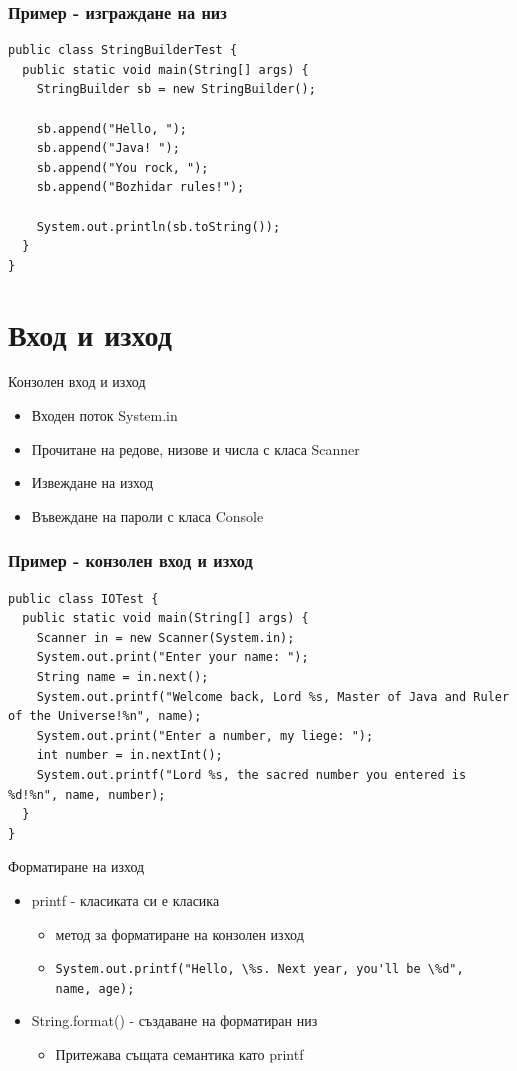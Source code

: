 \documentclass{beamer}
\begin{document}
\begin{frame}[fragile]
  \frametitle{Пример - изграждане на низ}
  \transdissolve
\begin{lstlisting}
public class StringBuilderTest {
  public static void main(String[] args) {
    StringBuilder sb = new StringBuilder();

    sb.append("Hello, ");
    sb.append("Java! ");
    sb.append("You rock, ");
    sb.append("Bozhidar rules!");

    System.out.println(sb.toString());
  }
}  
\end{lstlisting}
\end{frame}

\section{Вход и изход}
\begin{frame}{Конзолен вход и изход}
  \transdissolve
  \begin{itemize}
  \item Входен поток System.in \pause
  \item Прочитане на редове, низове и числа с класа Scanner \pause
  \item Извеждане на изход \pause
  \item Въвеждане на пароли с класа Console
  \end{itemize}
\end{frame}

\begin{frame}[fragile]
  \frametitle{Пример - конзолен вход и изход}
  \transdissolve
\begin{lstlisting}
public class IOTest {
  public static void main(String[] args) {
    Scanner in = new Scanner(System.in);
    System.out.print("Enter your name: ");
    String name = in.next();
    System.out.printf("Welcome back, Lord %s, Master of Java and Ruler of the Universe!%n", name);
    System.out.print("Enter a number, my liege: ");
    int number = in.nextInt();
    System.out.printf("Lord %s, the sacred number you entered is %d!%n", name, number);
  }
}  
\end{lstlisting}
\end{frame}

\begin{frame}{Форматиране на изход}
  \transdissolve
  \begin{itemize}
  \item printf - класиката си е класика \pause
    \begin{itemize}
      \item метод за форматиране на конзолен изход \pause
      \item \lstinline{System.out.printf("Hello, \%s. Next year, you'll be \%d",
        name, age);} \pause
    \end{itemize}
  \item String.format() - създаване на форматиран низ \pause
    \begin{itemize}
      \item Притежава същата семантика като printf
    \end{itemize}
  \end{itemize}
\end{frame}
\end{document}
